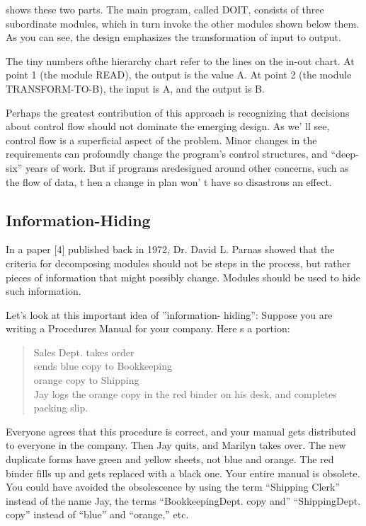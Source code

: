 
 shows these two parts. The main program, called DOIT,
consists of three subordinate modules, which in turn invoke the other
modules shown below them. As you can see, the design emphasizes the
transformation of input to output. 

The tiny numbers ofthe hierarchy chart refer to the lines on the in-out
chart. At point 1 (the module READ), the output is the value A. At
point 2 (the module TRANSFORM-TO-B), the input is A, and the output
is B. 

Perhaps the greatest contribution of this approach is recognizing
that decisions about control flow should not dominate the emerging
design. As we' ll see, control flow is a superficial aspect of the
problem. Minor changes in the requirements can profoundly change the
program's control structures, and {}``deep-six'' years of work.
But if programs aredesigned around other concerns, such as the flow
of data, t hen a change in plan won' t have so disastrous an effect.


\subsection{Information-Hiding }

In a paper {[}4{]} published back in 1972, Dr. David L. Parnas showed
that the criteria for decomposing modules should not be steps in the
process, but rather pieces of information that might possibly change.
Modules should be used to hide such information.

Let's look at this important idea of ''information- hiding'': Suppose
you are writing a Procedures Manual for your company. Here s a portion:

\begin{quote}
Sales Dept. takes order\\
sends blue copy to Bookkeeping\\
orange copy to Shipping\\
Jay logs the orange copy in the red binder on his desk, and completes
packing slip.
\end{quote}
Everyone agrees that this procedure is correct, and your manual gets
distributed to everyone in the company. Then Jay quits, and Marilyn
takes over. The new duplicate forms have green and yellow sheets,
not blue and orange. The red binder fills up and gets replaced with
a black one. Your entire manual is obsolete. You could have avoided
the obsolescence by using the term {}``Shipping Clerk'' instead
of the name Jay, the terms {}``BookkeepingDept. copy and'' {}``ShippingDept.
copy'' instead of {}``blue'' and {}``orange,'' etc.


